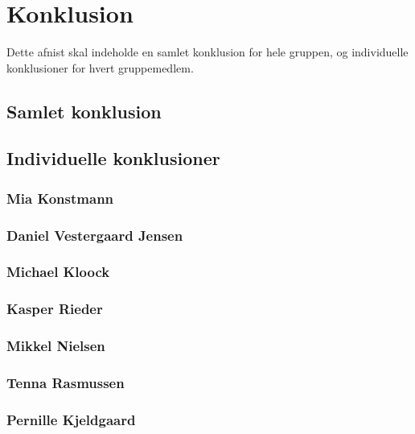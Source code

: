 \chapter{Konklusion}
Dette afnist skal indeholde en samlet konklusion for hele gruppen, og individuelle konklusioner for hvert gruppemedlem.

\section{Samlet konklusion}

\section{Individuelle konklusioner}

\subsection{Mia Konstmann}
\subsection{Daniel Vestergaard Jensen}
\subsection{Michael Kloock}
\subsection{Kasper Rieder}
\subsection{Mikkel Nielsen}
\subsection{Tenna Rasmussen}
\subsection{Pernille Kjeldgaard}